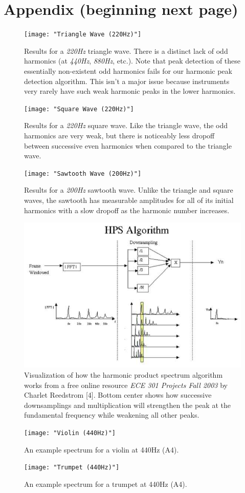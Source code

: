 \documentclass[12pt]{article}
\begin{document}
\section{Appendix (beginning next page)}
 \hypertarget{Appendix}{}
\begin{figure}[h!]
	\centerline{\texttt{[image: "Triangle Wave (220Hz)"]}}
	\caption{Results for a \textit{220Hz} triangle wave. There is a distinct lack of odd harmonics (at \textit{440Hz}, \textit{880Hz}, etc.). Note that peak detection of these essentially non-existent odd harmonics fails for our harmonic peak detection algorithm. This isn't a major issue because instruments very rarely have such weak harmonic peaks in the lower harmonics.}
\end{figure}
\begin{figure}[h!]
	\centerline{\texttt{[image: "Square Wave (220Hz)"]}}
	\caption{Results for a \textit{220Hz} square wave. Like the triangle wave, the odd harmonics are very weak, but there is noticeably less dropoff between successive even harmonics when compared to the triangle wave.}
\end{figure}
\begin{figure}[h!]
	\centerline{\texttt{[image: "Sawtooth Wave (200Hz)"]}}
	\caption{Results for a \textit{200Hz} sawtooth wave. Unlike the triangle and square waves, the sawtooth has measurable amplitudes for all of its initial harmonics with a slow dropoff as the harmonic number increases.}
\end{figure}
\begin{figure}[h!]
	\centerline{\includegraphics[width=1.4\textwidth]{"HPS_Algorithm"}}
	\caption{Visualization of how the harmonic product spectrum algorithm works from a free online resource \textit{ECE 301 Projects Fall 2003} by Charlet Reedstrom [4]. Bottom center shows how successive downsamplings and multiplication will strengthen the peak at the fundamental frequency while weakening all other peaks.}
\end{figure}

\begin{figure}[h!]
	\centerline{\texttt{[image: "Violin (440Hz)"]}}
	\caption{An example spectrum for a violin at 440Hz (A4).}
\end{figure}

\begin{figure}[h!]
	\centerline{\texttt{[image: "Trumpet (440Hz)"]}}
	\caption{An example spectrum for a trumpet at 440Hz (A4).}
\end{figure}
\end{document}
